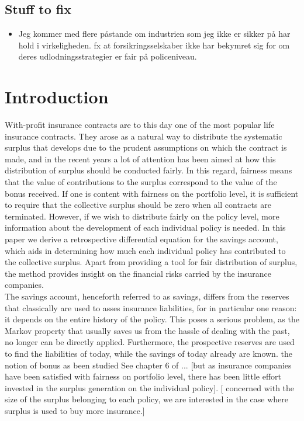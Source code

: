 \documentclass[12pt]{article}
\begin{document}
\subsection*{Stuff to fix}
\begin{itemize}
\item Jeg kommer med flere påstande om industrien som jeg ikke er sikker på har hold i virkeligheden. fx at forsikringsselskaber ikke har bekymret sig for om deres udlodningsstrategier er fair på policeniveau.
\end{itemize}
\section*{Introduction}

With-profit insurance contracts are to this day one of the most popular life insurance contracts. They arose as a natural way to distribute the systematic surplus that develops due to the prudent assumptions on which the contract is made, and in the recent years a lot of attention has been aimed at how this distribution of surplus should be conducted fairly. In this regard, fairness means that the value of contributions to the surplus correspond to the value of the bonus received. If one is content with fairness on the portfolio level, it is sufficient to require that the collective surplus should be zero when all contracts are terminated. However, if we wish to distribute fairly on the policy level, more information about the development of each individual policy is needed. In this paper we derive a retrospective differential equation for the savings account, which aids in determining how much each individual policy has contributed to the collective surplus. Apart from providing a tool for fair distribution of surplus, the method provides insight on the financial risks carried by the insurance companies.\\
The savings account, henceforth referred to as savings, differs from the reserves that classically are used to asses insurance liabilities, for in particular one reason: it depends on the entire history of the policy. This poses a serious problem, as the Markov property that usually saves us from the hassle of dealing with the past, no longer can be directly applied. Furthermore, the prospective reserves are used to find the liabilities of today, while the savings of today already are known. the notion of bonus as been studied See chapter 6 of \citet{Liv2}... [but as insurance companies have been satisfied with fairness on portfolio level, there has been little effort invested in the surplus generation on the individual policy]. [\citep{NorbergB} concerned with the size of the surplus belonging to each policy, we are interested in the case where surplus is used to buy more insurance.]
\end{document}
